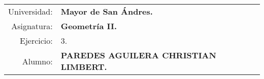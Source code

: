 \begin{tabular}{r l }
Universidad: & \textbf{Mayor de San Ándres.}\\
Asignatura: & \textbf{Geometría II.}\\
Ejercicio: & 3.\\ 
Alumno: & \textbf{PAREDES AGUILERA CHRISTIAN LIMBERT.}
\end{tabular}
\begin{flushleft}
\end{flushleft}
\vspace{.2cm}
